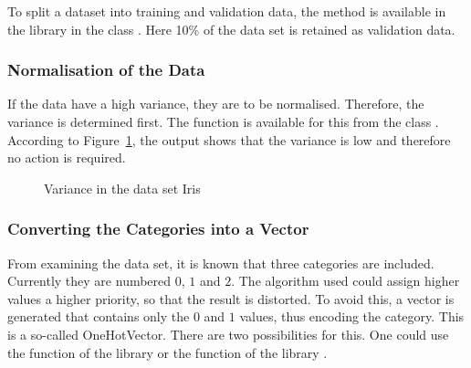 To split a dataset into training and validation data, the method  is available in the library  in the class . Here 10\% of the data set is retained as validation data.

\medskip


\medskip

\subsubsection{Normalisation of the Data}

If the data have a high variance, they are to be normalised. Therefore, the variance is determined first. The function  is available for this from the class . According to Figure~\ref{TensorFlowIrisVar}, the output shows that the variance is low and therefore no action is required.

\medskip


\medskip


\begin{figure}[H]
    \caption{Variance in the data set Iris}\label{TensorFlowIrisVar}
\end{figure}

\subsubsection{Converting the Categories into a Vector}

From examining the data set, it is known that three categories are included. Currently they are numbered $0$, $1$ and $2$. The algorithm used could assign higher values a higher priority, so that the result is distorted. To avoid this, a vector is generated that contains only the $0$ and $1$ values, thus encoding the category. This is a so-called \glqq OneHotVector\grqq{}. There are two possibilities for this. One could use the function  of the library  or the function  of the library .

\medskip


